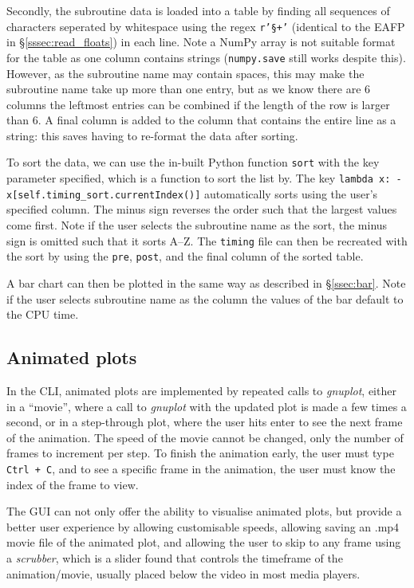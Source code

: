 \documentclass[12pt]{article}
\begin{document}
Secondly, the subroutine data is loaded into a table by finding all sequences of characters seperated by whitespace using the regex \texttt{r'\S+'} (identical to the EAFP in \S\ref{sssec:read_floats}) in each line. Note a NumPy array is not suitable format for the table as one column contains strings (\texttt{numpy.save} still works despite this). However, as the subroutine name may contain spaces, this may make the subroutine name take up more than one entry, but as we know there are 6 columns the leftmost entries can be combined if the length of the row is larger than 6. A final column is added to the column that contains the entire line as a string: this saves having to re-format the data after sorting.

To sort the data, we can use the in-built Python function \texttt{sort} with the key parameter specified, which is a function to sort the list by. The key \texttt{lambda x: -x[self.timing_sort.currentIndex()]} automatically sorts using the user's specified column. The minus sign reverses the order such that the largest values come first. Note if the user selects the subroutine name as the sort, the minus sign is omitted such that it sorts A--Z. The \texttt{timing} file can then be recreated with the sort by using the \texttt{pre},  \texttt{post}, and the final column of the sorted table.

A bar chart can then be plotted in the same way as described in \S\ref{ssec:bar}. Note if the user selects subroutine name as the column the values of the bar default to the CPU time.

\subsection{Animated plots}\label{ssec:animated_plots}

In the CLI, animated plots are implemented by repeated calls to \textit{gnuplot}, either in a ``movie'', where a call to \textit{gnuplot} with the updated plot is made a few times a second, or in a step-through plot, where the user hits enter to see the next frame of the animation. The speed of the movie cannot be changed, only the number of frames to increment per step. To finish the animation early, the user must type \texttt{Ctrl + C}, and to see a specific frame in the animation, the user must know the index of the frame to view.

The GUI can not only offer the ability to visualise animated plots, but provide a better user experience by allowing customisable speeds, allowing saving an .mp4 movie file of the animated plot, and allowing the user to skip to any frame using a \textit{scrubber}, which is a slider found that controls the timeframe of the animation/movie, usually placed below the video in most media players.
\end{document}
